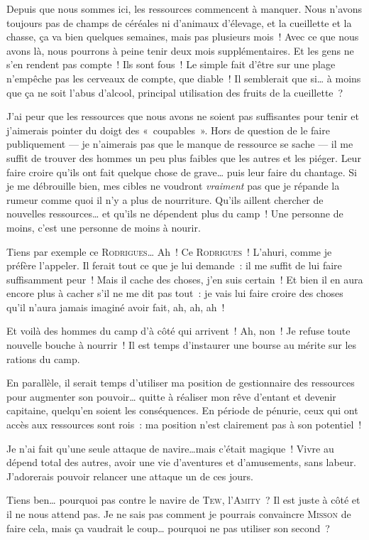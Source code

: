 {
	Depuis que nous sommes ici, les ressources commencent à manquer.
	Nous n’avons toujours pas de champs de céréales ni d’animaux d’élevage, et la cueillette et la chasse, ça va bien quelques semaines, mais pas plusieurs mois~!
	Avec ce que nous avons là, nous pourrons à peine tenir deux mois supplémentaires.
	Et les gens ne s’en rendent pas compte~!
	Ils sont fous~!  Le simple fait d’être sur une plage n’empêche pas les cerveaux de compte, que diable~!
	Il semblerait que si… à moins que ça ne soit l’abus d’alcool, principal utilisation des fruits de la cueillette~?

	J’ai peur que les ressources que nous avons ne soient pas suffisantes pour tenir et j’aimerais pointer du doigt des «~coupables~».
	Hors de question de le faire publiquement — je n’aimerais pas que le manque de ressource se sache — il me suffit de trouver des hommes un peu plus faibles que les autres et les piéger.
	Leur faire croire qu’ils ont fait quelque chose de grave… puis leur faire du chantage.
	Si je me débrouille bien, mes cibles ne voudront \emph{vraiment} pas que je répande la rumeur comme quoi il n’y a plus de nourriture.
	Qu’ils aillent chercher de nouvelles ressources… et qu’ils ne dépendent plus du camp~!  Une personne de moins, c’est une personne de moins à nourir.

	Tiens par exemple ce \textsc{Rodrigues}…  Ah~!  Ce \textsc{Rodrigues}~!
	L’ahuri, comme je préfère l’appeler.
	Il ferait tout ce que je lui demande~:  il me suffit de lui faire suffisamment peur~!
	Mais il cache des choses, j’en suis certain~!  Et bien il en aura encore plus à cacher s’il ne me dit pas tout~:  je vais lui faire croire des choses qu’il n’aura jamais imaginé avoir fait, ah, ah, ah~!

	Et voilà des hommes du camp d’à côté qui arrivent~! Ah, non~!  Je refuse toute nouvelle bouche à nourrir~!  Il est temps d’instaurer une bourse au mérite sur les rations du camp.

	En parallèle, il serait temps d’utiliser ma position de gestionnaire des ressources pour augmenter son pouvoir… quitte à réaliser mon rêve d’entant et devenir capitaine, quelqu’en soient les conséquences.
	En période de pénurie, ceux qui ont accès aux ressources sont rois~:  ma position n’est clairement pas à son potentiel~!

	Je n’ai fait qu’une seule attaque de navire\ldots mais c’était magique~!
	Vivre au dépend total des autres, avoir une vie d’aventures et d’amusements, sans labeur.
	J’adorerais pouvoir relancer une attaque un de ces jours.

	Tiens ben… pourquoi pas contre le navire de \textsc{Tew}, l’\textsc{Amity}~?  Il est juste à côté et il ne nous attend pas.
	Je ne sais pas comment je pourrais convaincre \textsc{Misson} de faire cela, mais ça vaudrait le coup… pourquoi ne pas utiliser son second~?
}

